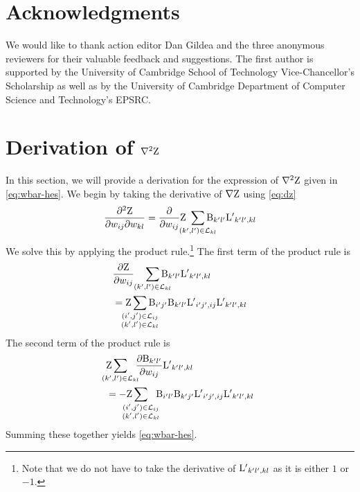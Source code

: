 \documentclass[11pt,a4paper]{article}
\theoremstyle{definition}
\begin{document}
\section*{Acknowledgments}
We would like to thank action editor Dan Gildea and the three anonymous reviewers for their valuable feedback and suggestions. 
The first author is supported by the University of Cambridge School of Technology Vice-Chancellor's Scholarship as well as by the University of Cambridge Department of Computer Science and Technology's EPSRC.




\clearpage
\appendix

\section{Derivation of $\nabla^2{\mathrm{Z}}$}\label{app:hes}
In this section, we will provide a derivation for the expression of $\nabla^2{\mathrm{Z}}$ given in \cref{eq:wbar-hes}.
We begin by taking the derivative of $\nabla{\mathrm{Z}}$ using \cref{eq:dz}
\begin{align*}
    \frac{\partial^2\wbar}{\partial\wedge{ij}\partial\wedge{kl}} = \frac{\partial}{\partial\wedge{ij}} \wbar\  \smashoperator{\sum_{(k',l')\in\col{k}{l}}}\cachedelem{k'l'}\dlap{k'l'}{kl}
\end{align*}
We solve this by applying the product rule.\footnote{Note that we do not have to take the derivative of ${{\mathrm{L}'}_{k'l',kl}}$ as it is either $1$ or $-1$.}
The first term of the product rule is
\begin{align*}
    &\frac{\partial\wbar}{\partial\wedge{ij}}\ \ \ \smashoperator{\sum_{(k',l')\in\col{k}{l}}}\cachedelem{k'l'}\dlap{k'l'}{kl} \\
    &=\wbar\smashoperator{\sum_{\substack{(i',j')\in\col{i}{j} \\(k',l')\in\col{k}{l}}}}\cachedelem{i'j'}\cachedelem{k'l'}\dlap{i'j'}{ij}\dlap{k'l'}{kl}
\end{align*}
The second term of the product rule is
\begin{align*}
    &\wbar\smashoperator{\sum_{(k',l')\in\col{k}{l}}}\ \ \frac{\partial\cachedelem{k'l'}}{\partial\wedge{ij}}\dlap{k'l'}{kl} \\
    &= -\wbar\smashoperator{\sum_{\substack{(i',j')\in\col{i}{j} \\(k',l')\in\col{k}{l}}}}\ \ \cachedelem{i'l'}\cachedelem{k'j'}\dlap{i'j'}{ij}\dlap{k'l'}{kl}
\end{align*}
Summing these together yields \cref{eq:wbar-hes}.
\end{document}
